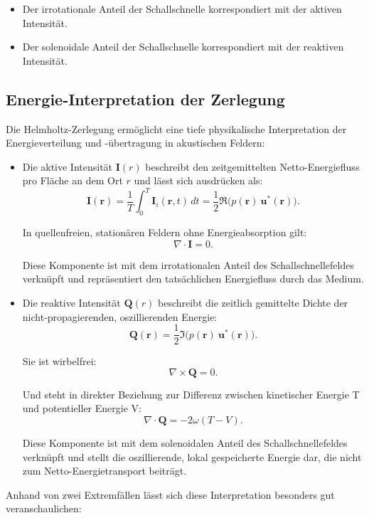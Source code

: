 \begin{itemize}
\item
Der irrotationale Anteil der Schallschnelle korrespondiert mit der
aktiven Intensität.
\item
Der solenoidale Anteil der Schallschnelle korrespondiert mit der
reaktiven Intensität.
\end{itemize}

\subsection{Energie-Interpretation der Zerlegung
\label{helmholtz:Energie_Interpretation}}
Die Helmholtz-Zerlegung ermöglicht eine tiefe physikalische
Interpretation der Energieverteilung und -übertragung in akustischen
Feldern:
\begin{itemize}
\item
Die aktive Intensität $\boldsymbol{I}(r)$ beschreibt den zeitgemittelten
Netto-Energiefluss pro Fläche an dem Ort $r$ und lässt sich ausdrücken
als:
\begin{equation}
\boldsymbol{I}(\boldsymbol{r})
=
\frac{1}{T}\int_0^T \boldsymbol{I}_i(\boldsymbol{r},t)\,dt
=
\frac{1}{2}\Re\bigl( p(\boldsymbol{r})~\boldsymbol{u}^*(\boldsymbol{r})\bigr).
\end{equation}
 
In quellenfreien, stationären Feldern ohne Energieabsorption gilt:
\begin{equation}
\nabla \cdot \boldsymbol{I}
=
0.
\end{equation}
 
Diese Komponente ist mit dem irrotationalen Anteil des Schallschnellefeldes verknüpft und repräsentiert den tatsächlichen Energiefluss durch das Medium.
 
\item Die reaktive Intensität $\boldsymbol{Q}(r)$ beschreibt die zeitlich gemittelte Dichte der nicht-propagierenden, oszillierenden Energie:
\begin{equation}
\boldsymbol{Q}(\boldsymbol{r})
=
\frac{1}{2}\Im\bigl(p(\boldsymbol{r})~\boldsymbol{u}^*(\boldsymbol{r})\bigr).
\end{equation}
 
Sie ist wirbelfrei:
\begin{equation}
\nabla \times \boldsymbol{Q}
=
0.
\end{equation}
 
Und steht in direkter Beziehung zur Differenz zwischen kinetischer Energie T und potentieller Energie V:
\begin{equation}
\nabla \cdot \boldsymbol{Q}
=
-2 \omega (T-V).
\end{equation}
 
Diese Komponente ist mit dem solenoidalen Anteil des Schallschnellefeldes verknüpft und stellt die oszillierende, lokal gespeicherte Energie dar, die nicht zum Netto-Energietransport beiträgt.
\end{itemize}
Anhand von zwei Extremfällen lässt sich diese Interpretation besonders gut veranschaulichen:

